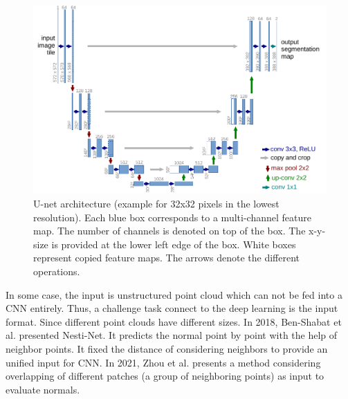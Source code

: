 \begin{figure}[!h]
	\centering
	\includegraphics[width=\textwidth]{./ref/u-net-illustration-correct-scale2}
	\caption{U-net architecture (example for 32x32 pixels in the lowest resolution). Each blue box corresponds to a multi-channel feature map. The number of channels is denoted on top of the box. The x-y-size is provided at the lower left edge of the box. White boxes represent copied feature maps. The arrows denote the different operations.
	}
	\label{fig:u-net}
\end{figure}



In some case, the input is unstructured point cloud which can not be fed into a CNN entirely. Thus, a challenge task connect to the deep learning is the input format. Since different point clouds have different sizes. 
In 2018, Ben-Shabat et al. \cite{Ben-Shabat_2019_CVPR} presented Nesti-Net. It predicts the normal point by point with the help of neighbor points. It fixed the distance of considering neighbors to provide an unified input for CNN. In 2021, Zhou et al. \cite{zhou2021fast} presents a method considering overlapping of different patches (a group of neighboring points) as input to evaluate normals. 
 















